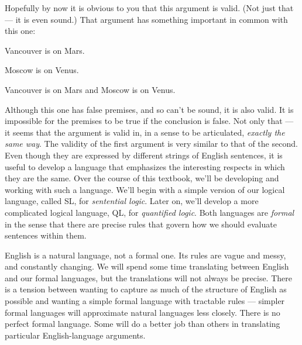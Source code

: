 Hopefully by now it is obvious to you that this argument is valid. (Not just that --- it is even sound.) That argument has something important in common with this one:

\begin{earg}
\item[] Vancouver is on Mars.
\item[] Moscow is on Venus.
\item[\therefore] Vancouver is on Mars and Moscow is on Venus.
\end{earg}

Although this one has false premises, and so can't be sound, it is also valid. It is impossible for the premises to be true if the conclusion is false. Not only that --- it seems that the argument is valid in, in a sense to be articulated, \emph{exactly the same way}. The validity of the first argument is very similar to that of the second. Even though they are expressed by different strings of English sentences, it is useful to develop a language that emphasizes the interesting respects in which they are the same. Over the course of this textbook, we'll be developing and working with such a language. We'll begin with a simple version of our logical language, called SL, for \emph{sentential logic}. Later on, we'll develop a more complicated logical language, QL, for \emph{quantified logic}. Both languages are \emph{formal} in the sense that there are precise rules that govern how we should evaluate sentences within them.

%

English is a natural language, not a formal one. Its rules are vague and messy, and constantly changing. We will spend some time translating between English and our formal languages, but the translations will not always be precise. There is a tension between wanting to capture as much of the structure of English as possible and wanting a simple formal language with tractable rules --- simpler formal languages will approximate natural languages less closely. There is no perfect formal language. Some will do a better job than others in translating particular English-language arguments.

